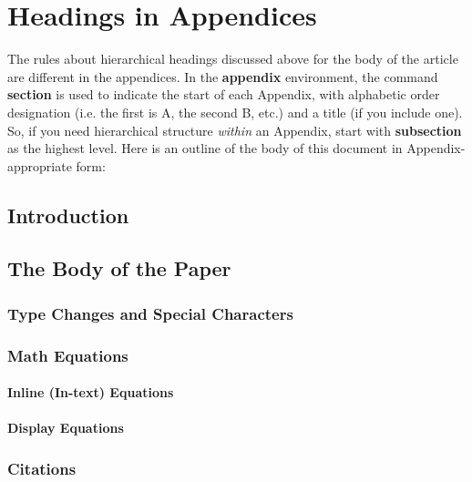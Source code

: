 \documentclass{sig-alternate}
\begin{document}
	
	\appendix
	\section{Headings in Appendices}
	The rules about hierarchical headings discussed above for
	the body of the article are different in the appendices.
	In the \textbf{appendix} environment, the command
	\textbf{section} is used to
	indicate the start of each Appendix, with alphabetic order
	designation (i.e. the first is A, the second B, etc.) and
	a title (if you include one).  So, if you need
	hierarchical structure
	\textit{within} an Appendix, start with \textbf{subsection} as the
	highest level. Here is an outline of the body of this
	document in Appendix-appropriate form:
	\subsection{Introduction}
	\subsection{The Body of the Paper}
	\subsubsection{Type Changes and  Special Characters}
	\subsubsection{Math Equations}
	\paragraph{Inline (In-text) Equations}
	\paragraph{Display Equations}
	\subsubsection{Citations}
\end{document}
